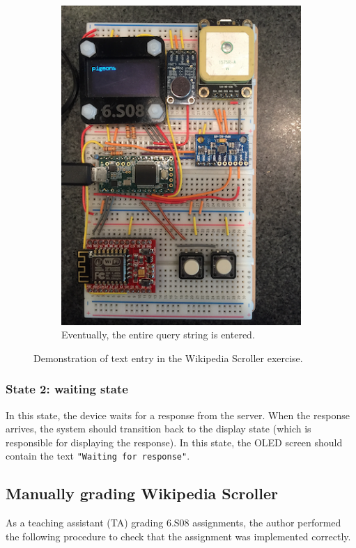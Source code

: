 \documentclass[12pt]{article}
\begin{document}
\begin{figure}
\begin{subfigure}[b]{.3\linewidth}
\includegraphics[width=\linewidth]{text-pigeons}
\caption{Eventually, the entire query string is entered.}
\label{fig:text-pigeons}
\end{subfigure}

\caption{Demonstration of text entry in the Wikipedia Scroller exercise.}
\label{fig:pigeon-entry}
\end{figure}

\subsubsection{State 2: waiting state}
In this state, the device waits for a response from the server.  When the response arrives, the system should transition back to the display state (which is responsible for displaying the response).  In this state, the OLED screen should contain the text \texttt{"Waiting for response"}.

\subsection{Manually grading Wikipedia Scroller}
\label{sec:manual-wiki-grade}
As a teaching assistant (TA) grading 6.S08 assignments, the author performed the following procedure to check that the assignment was implemented correctly.
\end{document}
